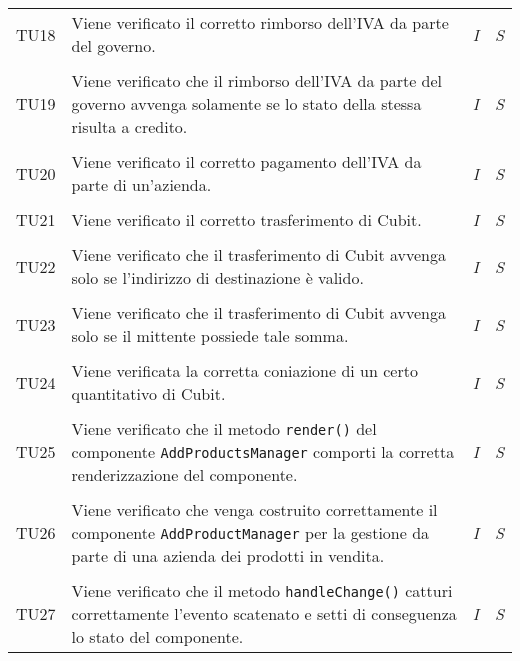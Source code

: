 \begin{longtable}{ >{\centering}p{} >{}p{}
				>{\centering}p{} >{\centering}p{}}
			\tabularnewline
			\hypertarget{TU18}{TU18} & Viene verificato il corretto rimborso 
			dell'IVA da parte del governo. & \textit{I} & \textit{S}\\ 
				
			\tabularnewline
			\hypertarget{TU19}{TU19} & Viene verificato che il rimborso 
			dell'IVA da parte del governo avvenga solamente se lo stato della 
			stessa risulta a credito. & \textit{I} & \textit{S}\\ 
			
			\tabularnewline
			\hypertarget{TU20}{TU20} & Viene verificato il corretto pagamento 
			dell'IVA da parte di un'azienda. & \textit{I} & \textit{S}\\
			
			\tabularnewline
			\hypertarget{TU21}{TU21} & Viene verificato il corretto 
			trasferimento di Cubit. & \textit{I} & 
			\textit{S}\\ 
			
			\tabularnewline
			\hypertarget{TU22}{TU22} & Viene verificato che il trasferimento di 
			Cubit avvenga solo se l'indirizzo di destinazione è valido. & 
			\textit{I} & \textit{S}\\
			
			\tabularnewline
			\hypertarget{TU23}{TU23} & Viene verificato che il trasferimento di 
			Cubit avvenga solo se il mittente possiede tale somma. & \textit{I} 
			& \textit{S}\\ 
			
			\tabularnewline
			\hypertarget{TU24}{TU24} & Viene verificata la corretta coniazione 
			di un certo quantitativo di Cubit. & \textit{I} & \textit{S}\\  
			
			\tabularnewline
			\hypertarget{TU25}{TU25} &Viene verificato che il metodo 
			\texttt{render()} del componente \texttt{AddProductsManager} 
			comporti la corretta renderizzazione del componente. & \textit{I} & 
			\textit{S}\\
			
			\tabularnewline
			\hypertarget{TU26}{TU26} & Viene verificato che venga costruito 
			correttamente il componente \texttt{AddProductManager} per la 
			gestione da parte di una azienda dei prodotti in vendita. & 
			\textit{I} & 
			\textit{S}\\
			
			\tabularnewline
			\hypertarget{TU27}{TU27} & Viene verificato che il metodo 
			\texttt{handleChange()} catturi correttamente l'evento scatenato e 
			setti di conseguenza lo stato del componente. & 
			\textit{I} & 
			\textit{S}\\
			

\end{longtable}
